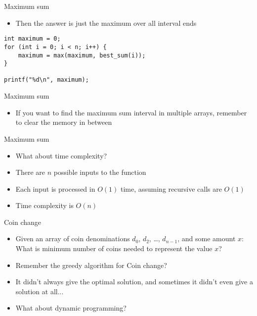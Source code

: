\documentclass[12pt,t]{beamer}
\newcommand{\bi}{\begin{itemize}}
\newcommand{\ei}{\end{itemize}}
\begin{document}
\begin{frame}[fragile]{Maximum sum}
    \bi
        \item Then the answer is just the maximum over all interval ends
    \ei

    \begin{verbatim}
int maximum = 0;
for (int i = 0; i < n; i++) {
    maximum = max(maximum, best_sum(i));
}

printf("%d\n", maximum);
    \end{verbatim}
\end{frame}

\begin{frame}[fragile]{Maximum sum}
    \vspace{40pt}
    \bi
        \item If you want to find the maximum sum interval in multiple arrays, remember to clear the memory in between
    \ei
\end{frame}

\begin{frame}{Maximum sum}
    \vspace{20pt}
    \bi
        \item What about time complexity?
        \vspace{5pt}
        \item There are $n$ possible inputs to the function
        \item Each input is processed in $O(1)$ time, assuming recursive calls are $O(1)$
        \item Time complexity is $O(n)$
    \ei
\end{frame}

\begin{frame}{Coin change}
    \vspace{20pt}

    \bi
\item Given an array of coin denominations $d_0$, $d_2$, \ldots, $d_{n-1}$,
            and some amount $x$: What is minimum number of coins needed to
            represent the value $x$?

        \item Remember the greedy algorithm for Coin change?
        \item It didn't always give the optimal solution, and sometimes it didn't even give a solution at all...

        \vspace{10pt}
        \item What about dynamic programming?
    \ei
\end{frame}
\end{document}
